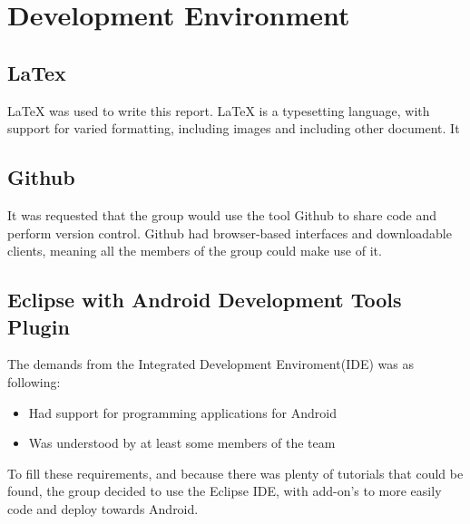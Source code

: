 \chapter{Development Environment}

\section{LaTex}
LaTeX was used to write this report. LaTeX is a typesetting language, with support for varied formatting, including images and including other document. It
\section{Github}
It was requested that the group would use the tool Github to share code and perform version control. Github had browser-based interfaces and downloadable clients, meaning all the members of the group could make use of it. 


\section{Eclipse with Android Development Tools Plugin}
The demands from the Integrated Development Enviroment(IDE) was as following:
\begin{itemize}
\item Had support for programming applications for Android
\item Was understood by at least some members of the team
\end{itemize}
To fill these requirements, and because there was plenty of tutorials that could be found, the group decided to use the Eclipse IDE, with add-on's to more easily code and deploy towards Android. 

\section{}
 